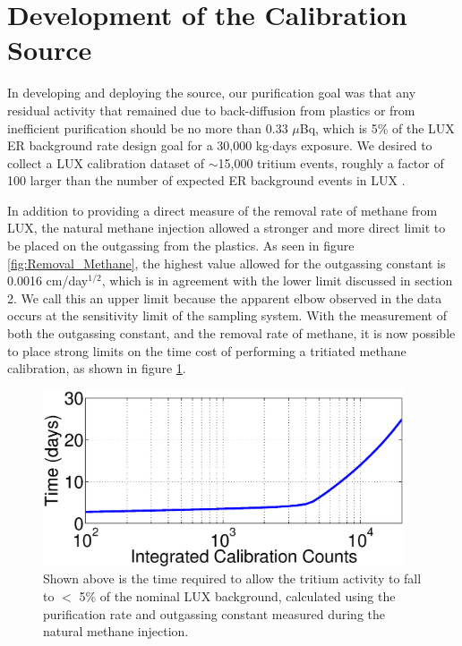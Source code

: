 \section{Development of the Calibration Source}

In developing and deploying the source, our purification goal was that any residual activity that remained due to back-diffusion from plastics or from inefficient purification should be no more than 0.33 $\mu$Bq, which is 5\% of the LUX ER background rate design goal for a 30,000 kg$\cdot$days exposure. We desired to collect a LUX calibration dataset of $\sim$15,000 tritium events, roughly a factor of 100 larger than the number of expected ER background events in LUX \cite{LUX_BG} . 



In addition to providing a direct measure of the removal rate of methane from LUX, the natural methane injection allowed a stronger and more direct limit to be placed on the outgassing from the plastics. As seen in figure \ref{fig:Removal_Methane}, the highest value allowed for the outgassing constant is 0.0016 cm/day$^{1/2}$, which is in agreement with the lower limit discussed in section 2. We call this an upper limit because the apparent elbow observed in the data occurs at the sensitivity limit of the sampling system. With the measurement of both the outgassing constant, and the removal rate of methane, it is now possible to place strong limits on the time cost of performing a tritiated methane calibration, as shown in figure \ref{fig:cal_time}.

\begin{figure}[h!]
\centering
\includegraphics[width=0.95\textwidth]{Calibration_length.eps}
\caption{Shown above is the time required to allow the tritium activity to fall to $<$ 5\% of the nominal LUX background, calculated using the purification rate and outgassing constant measured during the natural methane injection. }
\label{fig:cal_time}
\end{figure}



